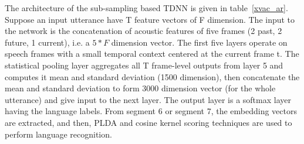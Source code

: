 \begin{spacing}{1.5}
The architecture of the sub-sampling based TDNN is given in table~\ref{xvac_ar}. Suppose an input utterance have T feature vectors of F dimension. The input to the network is the concatenation of acoustic features of five frames (2 past, 2 future, 1 current), i.e. a $5*F$ dimension vector. The first five layers operate on speech frames with a small temporal context centered at the current frame t. The statistical pooling layer aggregates all T frame-level outputs from layer 5 and computes it mean and standard deviation (1500 dimension), then concatenate the mean and standard deviation to form 3000 dimension vector (for the whole utterance) and give input to the next layer. The output layer is a softmax layer having the language labels. From segment 6 or segment 7, the embedding vectors are extracted, and then, PLDA and cosine kernel scoring techniques are used to perform language recognition.   
   
   
% 
% 
% 
% 
% 
% 
% 

\end{spacing} 